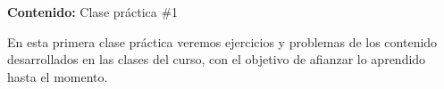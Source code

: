 {\Large\textbf{Contenido:} Clase práctica \#1}

En esta primera clase práctica veremos ejercicios y problemas de los contenido desarrollados en las clases del curso, con el objetivo de afianzar lo aprendido hasta el momento.